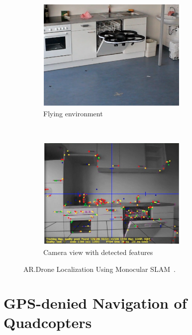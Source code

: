 	\begin{figure}[ht]
            \centering
            \begin{subfigure}[b]{0.5\textwidth}
                    \centering
                    \includegraphics[width=0.8\textwidth]{../images/Engel2.png}
                    \caption{Flying environment}
            \end{subfigure}%
            ~ %
            \begin{subfigure}[b]{0.5\textwidth}
                    \centering
                    \includegraphics[width=0.8\textwidth]{../images/Engel1.png}
                    \caption{Camera view with detected features}
            \end{subfigure}
            \caption{AR.Drone Localization Using Monocular SLAM~\cite{Engel2}.}
    \end{figure}


\section{GPS-denied Navigation of Quadcopters}


